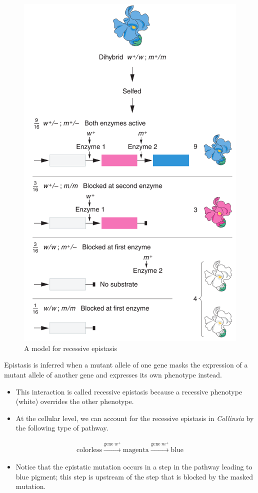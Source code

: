 \documentclass[11pt,dvipsnames,ignorenonframetext,aspectratio=169]{beamer}
\providecommand{\tightlist}{%
  \setlength{\itemsep}{0pt}\setlength{\parskip}{0pt}}
\begin{document}
\begin{frame}{}
\protect\hypertarget{section-19}{}
\begin{figure}

{\centering \includegraphics[width=0.3\linewidth]{./../images/recessive_epistasis} 

}

\caption{A model for recessive epistasis}\label{fig:recessive-epistasis}
\end{figure}
\end{frame}

\begin{frame}{}
\protect\hypertarget{section-20}{}
\begin{block}{}
Epistasis is inferred when a mutant allele of one gene masks the expression of a mutant allele of another gene and expresses its own phenotype instead.
\end{block}

\begin{itemize}
\tightlist
\item
  This interaction is called recessive epistasis because a recessive
  phenotype (white) overrides the other phenotype.
\item
  At the cellular level, we can account for the recessive epistasis in
  \emph{Collinsia} by the following type of pathway.
\end{itemize}

\[
\begin{aligned}
\textrm{colorless} \xrightarrow{\text{gene}~w^+} \textrm{magenta} \xrightarrow{\text{gene}~m^+} \textrm{blue}
\end{aligned}
\]

\begin{itemize}
\tightlist
\item
  Notice that the epistatic mutation occurs in a step in the pathway
  leading to blue pigment; this step is upstream of the step that is
  blocked by the masked mutation.
\end{itemize}
\end{frame}
\end{document}
